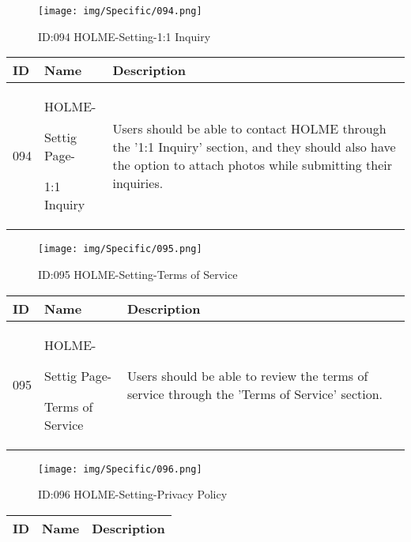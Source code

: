 \documentclass[conference]{IEEEtran}
\begin{document}
\begin{enumerate}
\begin{figure}[h]
\centering                                         
\texttt{[image: img/Specific/094.png]}
\caption{ID:094 HOLME-Setting-1:1 Inquiry}
\end{figure}
\begin{table}[h]
\def\arraystretch{1.2} \small
    \begin{tabular}{|p{1cm}|p{1.8cm}|p{5.0cm}|}
        \hline
        ID & Name & Description\\ \hline
         094 \par  & HOLME-\par Settig Page- \par 1:1 Inquiry& 
       	Users should be able to contact HOLME through the '1:1 Inquiry' section, and they should also have the option to attach photos while submitting their inquiries.
         \\ \hline
    \end{tabular}
\end{table}
\begin{figure}[h]
\centering                                         
\texttt{[image: img/Specific/095.png]}
\caption{ID:095 HOLME-Setting-Terms of Service}
\end{figure}
\begin{table}[h]
\def\arraystretch{1.2} \small
    \begin{tabular}{|p{1cm}|p{1.8cm}|p{5.0cm}|}
        \hline
        ID & Name & Description\\ \hline
         095 \par  & HOLME-\par Settig Page- \par Terms of Service& 
       	Users should be able to review the terms of service through the 'Terms of Service' section.
         \\ \hline
    \end{tabular}
\end{table}
\begin{figure}[h]
\centering                                         
\texttt{[image: img/Specific/096.png]}
\caption{ID:096 HOLME-Setting-Privacy Policy}
\end{figure}
\begin{table}[h]
\def\arraystretch{1.2} \small
    \begin{tabular}{|p{1cm}|p{1.8cm}|p{5.0cm}|}
        \hline
        ID & Name & Description\\ \hline

\end{tabular}
\end{table}
\end{enumerate}
\end{document}
